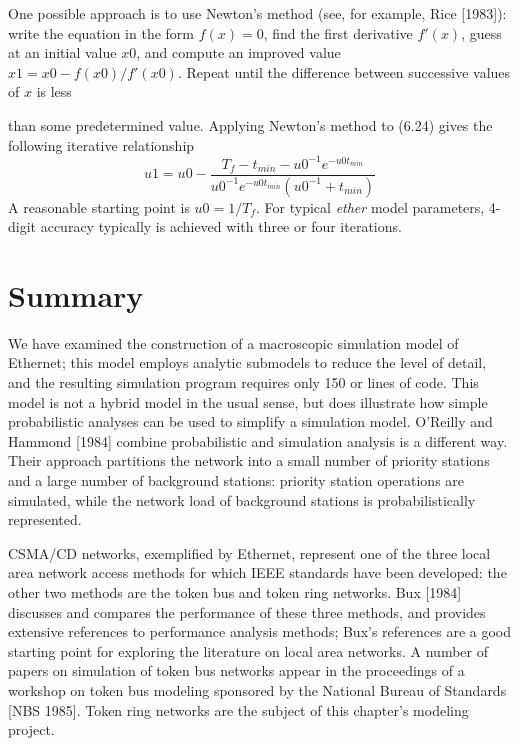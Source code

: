 One possible approach is to use Newton's method (see, for example, Rice [1983]): write the equation in the form $f(x)=0$, find the first derivative $f'(x)$, guess at an initial value $x0$, and compute an improved value $x1=x0-f(x0)/f'(x0)$. Repeat until the difference between successive values of $x$ is less

\noindent than some predetermined value. Applying Newton's method to (6.24) gives the following iterative relationship
\begin{equation} u1=u0-\frac{T_f-t_{min}-u0^{-1}e^{-u0t_{min}}}{u0^{-1}e^{-u0t_{min}}(u0^{-1}+t_{min})} \end{equation}
A reasonable starting point is $u0=1/T_f$. For typical \emph{ether} model parameters, 4-digit accuracy typically is achieved with three or four iterations.

\section{Summary}

We have examined the construction of a macroscopic simulation model of Ethernet; this model employs analytic submodels to reduce the level of detail, and the resulting simulation program requires only 150 or lines of code. This model is not a hybrid model in the usual sense, but does illustrate how simple probabilistic analyses can be used to simplify a simulation model. O'Reilly and Hammond [1984] combine probabilistic and simulation analysis is a different way. Their approach partitions the network into a small number of priority stations and a large number of background stations: priority station operations are simulated, while the network load of background stations is probabilistically represented.

CSMA/CD networks, exemplified by Ethernet, represent one of the three local area network access methods for which IEEE standards have been developed: the other two methods are the token bus and token ring networks. Bux [1984] discusses and compares the performance of these three methods, and provides extensive references to performance analysis methods; Bux's references are a good starting point for exploring the literature on local area networks. A number of papers on simulation of token bus networks appear in the proceedings of a workshop on token bus modeling sponsored by the National Bureau of Standards [NBS 1985]. Token ring networks are the subject of this chapter's modeling project.

